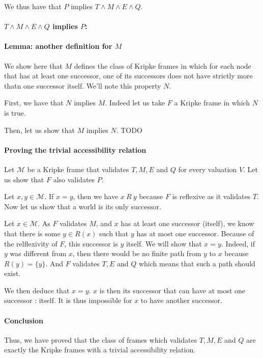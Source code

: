\documentclass[10pt]{article}
\def\M{\mathcal{M}}
\begin{document}
We thus have that $P$ implies $T\wedge M\wedge E\wedge Q$.

\paragraph{$T\wedge M\wedge E\wedge Q$ implies $P$:}

\paragraph{Lemma: another definition for $M$}
We show here that $M$ defines the class of Kripke frames in which for each node that has at least one successor, one of its successors does not have strictly more thatn one successor itself. We'll note this property $N$.

First, we have that $N$ implies $M$. Indeed let us take $F$ a Kripke frame in which $N$ is true.

Then, let us show that $M$ implies $N$.
TODO


\paragraph{Proving the trivial accessibility relation} Let $\M$ be a Kripke frame that validates $T,M,E$ and $Q$ for every valuation $V$. Let us show that $F$ also validates $P$.

Let $x,y\in\M$. If $x=y$, then we have $x\ R\ y$ because $F$ is reflexive as it validates $T$.
Now let us show that a world is its only successor.

Let $x\in\M$. As $F$ validates $M$, and $x$ has at least one successor (itself), we know that there is some $y\in R(x)$ such that $y$ has at most one successor. Because of the relflexivity of $F$, this successor is $y$ itself. We will show that $x=y$. Indeed, if $y$ was different from $x$, then there would be no finite path from $y$ to $x$ because $R(y)=\{y\}$. And $F$ validates $T,E$ and $Q$ which means that such a path should exist.

We then deduce that $x=y$. $x$ is then its successor that can have at most one successor : itself. It is thus impossible for $x$ to have another successor.

\paragraph{Conclusion}
Thus, we have proved that the class of frames which validates $T,M,E$ and $Q$ are exactly the Kripke frames with a trivial accessibility relation.
\end{document}
